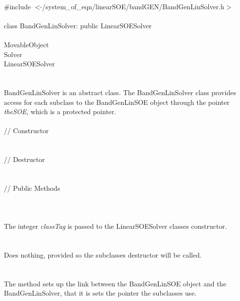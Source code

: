 
   \\
\indent \#include $<\tilde{ }$/system\_of\_eqn/linearSOE/bandGEN/BandGenLinSolver.h$>$  \\

  \\
\indent class BandGenLinSolver: public LinearSOESolver  \\

 \\
\indent MovableObject \\
\indent\indent  Solver \\
\indent\indent\indent LinearSOESolver \\
\indent\indent\indent{} \\

  \\
\indent BandGenLinSolver is an abstract class.  The BandGenLinSolver
class provides access for each subclass to the BandGenLinSOE object
through the pointer {\em theSOE}, which is a protected pointer. \\


  \\
\indent\indent // Constructor \\
\indent{}  \\ \\
\indent\indent // Destructor \\
\indent{}\\  \\
\indent\indent // Public Methods \\
\indent{} \\

  \\
  \\
The integer {\em classTag} is passed to the LinearSOESolver classes
constructor. \\ 

 \\
\\ 
Does nothing, provided so the subclasses destructor will be called. \\

  \\
 \\
The method sets up the link between the BandGenLinSOE object and the
BandGenLinSolver, that it is sets the pointer the subclasses use.  \\




